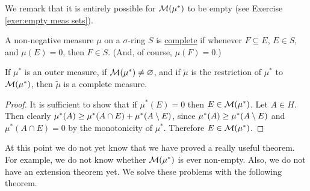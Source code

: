 We remark that it is entirely possible for ${\cal M}(\mu^*)$ to be empty (see Exercise \ref{exer:empty meas sets}).

\begin{definition}
A non-negative measure $\mu$ on a $\sigma$-ring ${S}$ is \underline{complete} if whenever $F \subseteq E$, $E \in S$, and $\mu(E)=0$, then $F\in S$. (And, of course, $\mu(F)=0$.)
\end{definition}

\begin{proposition}
If $\mu^*$ is an outer measure, if ${\cal M}(\mu^*) \neq \varnothing$, and if $\widetilde{\mu}$ is the restriction of $\mu^*$ to ${\cal M}(\mu^*)$, then $\widetilde{\mu}$ is a complete measure.
\end{proposition}

\begin{proof}
It is sufficient to show that if $\mu^*(E)=0$ then $E \in {\cal M}(\mu^*)$. Let $A \in H$. Then clearly $\mu^*(A) \geq \mu^*(A \cap E)+\mu^*(A\setminus E)$, since $\mu^*(A) \geq \mu^*(A\setminus E)$ and $\mu^*(A \cap E)=0$ by the monotonicity of $\mu^*$. Therefore $E \in {\cal M}(\mu^*)$.
\end{proof}

At this point we do not yet know that we have proved a really useful theorem. For example, we do not know whether ${\cal M}(\mu^*)$ is ever non-empty. Also, we do not have an extension theorem yet. We solve these problems with the following theorem.

